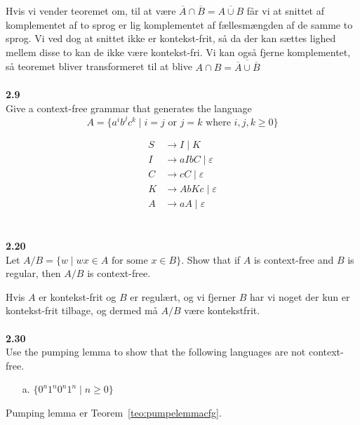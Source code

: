 Hvis vi vender teoremet om, til at være $\overline{A} \cap \overline{B} = \overline{A \cup B}$ får vi at snittet af komplementet af to sprog er lig komplementet af fællesmængden af de samme to sprog. Vi ved dog at snittet ikke er kontekst-frit, så da der kan sættes lighed mellem disse to kan de ikke være kontekst-fri. Vi kan også fjerne komplementet, så teoremet bliver transformeret til at blive $A \cap B = \overline{\overline{A} \cup \overline{B}}$\\\\

\noindent
{\Large \textbf{2.9}}\\
\noindent
Give a context-free grammar that generates the language
\[ A = \{a^{i}b^{j}c^{k}\; | \; i = j \text{ or }j = k \text{ where } i,j,k \ge 0 \}\]

\begin{equation*}
  \begin{split}
    S &\rightarrow I\;|\;K \\
    I &\rightarrow aIbC\;|\; \varepsilon\\
    C &\rightarrow cC\;|\; \varepsilon\\
    K &\rightarrow AbKc \;| \; \varepsilon\\
    A &\rightarrow aA \; | \; \varepsilon
  \end{split}
\end{equation*}
\\\\

\noindent
{\Large \textbf{2.20}}\\
\noindent
Let $A/B = \{w \; | \; wx \in A \text{ for some }x \in B\}$. Show that if $A$ is context-free and $B$ is regular, then $A/B$ is context-free.

Hvis $A$ er kontekst-frit og $B$ er regulært, og vi fjerner $B$ har vi noget der kun er kontekst-frit tilbage, og dermed må $A/B$ være kontekstfrit.\\\\

\noindent
{\Large \textbf{2.30}}\\ %
\noindent
Use the pumping lemma to show that the following languages are not context-free.

\begin{enumerate}
  \item[a.] $\{0^{n}1^{n}0^{n}1^{n}\;|\; n \ge 0\}$
\end{enumerate}

Pumping lemma er Teorem~\ref{teo:pumpelemmacfg}.


